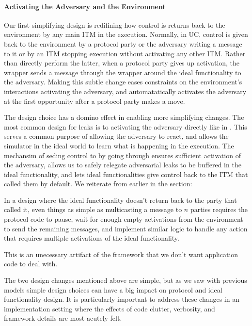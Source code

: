 \paragraph{Activating the Adversary and the Environment}
Our first simplifying design is redifining how control is returns back to the
environment by any main ITM in the execution.  Normally, in UC, control is
given back to the environment by a protocol party or the adversary writing a
message to it or by an ITM stopping execution without activating any other ITM.
Rather than directly perform the latter, when a protocol party gives up
activation, the wrapper sends a message through the wrapper around the ideal
functionality to the adversary.  Making this subtle change eases constraints on
the environment's interactions activating the adversary, and automatatically
activates the adversary at the first opportunity after a protocol party makes a
move.

The design choice has a domino effect in enabling more simplifying changes.
The most common design for leaks is to activating the adversary directly like
in \Fchan.  This serves a common purpose of allowing the adversary to react,
and allows the simulator in the ideal world to learn what is happening in the
execution.  The mechansim of seding control to \Z by going through \A ensures
sufficient activation of the adversary, allows us to safely relegate
adversarial leaks to be buffered in the ideal functionality, and lets ideal
functionalities give control back to the ITM that called them by default.  We
reiterate from earlier in the section: 
\begin{quoting} 
In a design where the ideal functionality doesn't return back to the party that
called it, even things as simple as multicasting a message to $n$ parties
requires the protocol code to pause, wait for enough empty activations from the
environment to send the remaining messages, and implement similar logic to
handle any action that requires multiple activations of the ideal
functionality.  
\end{quoting} 
This is an unecessary artifact of the framework that we don't want application
code to deal with. 

The two design changes mentioned above are simple, but as we saw with previous
models simple design choices can have a big impact on protocol and ideal
functionality design.  It is particularly important to address these changes in
an implementation setting where the effects of code clutter, verbosity, and
framework details are most acutely felt.

